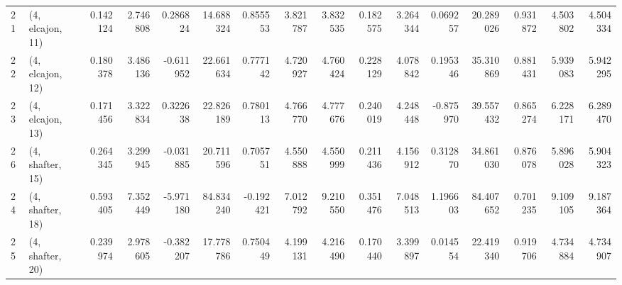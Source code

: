 \begin{tabular}{llrrrrrrrrrrrrrr}
21 &  (4, elcajon, 11) &   0.142124 &  2.746808 &  0.286824 &  14.688324 &  0.855553 &   3.821787 &  3.832535 &  0.182575 &   3.264344 &  0.069257 &   20.289026 &  0.931872 &   4.503802 &   4.504334 \\
22 &  (4, elcajon, 12) &   0.180378 &  3.486136 & -0.611952 &  22.661634 &  0.777142 &   4.720927 &  4.760424 &  0.228129 &   4.078842 &  0.195346 &   35.310869 &  0.881431 &   5.939083 &   5.942295 \\
23 &  (4, elcajon, 13) &   0.171456 &  3.322834 &  0.322638 &  22.826189 &  0.780113 &   4.766770 &  4.777676 &  0.240019 &   4.248448 & -0.875970 &   39.557432 &  0.865274 &   6.228171 &   6.289470 \\
26 &  (4, shafter, 15) &   0.264345 &  3.299945 & -0.031885 &  20.711596 &  0.705751 &   4.550888 &  4.550999 &  0.211436 &   4.156912 &  0.312870 &   34.861030 &  0.876078 &   5.896028 &   5.904323 \\
24 &  (4, shafter, 18) &   0.593405 &  7.352449 & -5.971180 &  84.834240 & -0.192421 &   7.012792 &  9.210550 &  0.351476 &   7.048513 &  1.196603 &   84.407652 &  0.701235 &   9.109105 &   9.187364 \\
25 &  (4, shafter, 20) &   0.239974 &  2.978605 & -0.382207 &  17.778786 &  0.750449 &   4.199131 &  4.216490 &  0.170440 &   3.399897 &  0.014554 &   22.419340 &  0.919706 &   4.734884 &   4.734907 \\
\bottomrule
\end{tabular}
